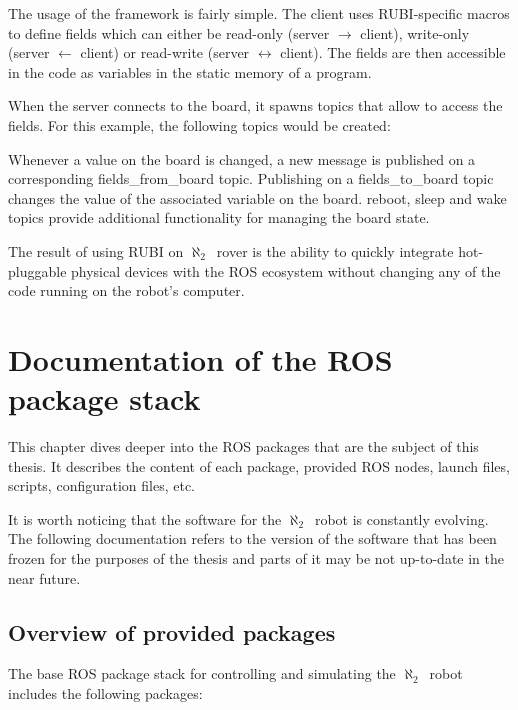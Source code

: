 \documentclass[english,inz,shortabstract]{iithesis}
\newcommand{\rovername}{$\aleph_2$\ }
\begin{document}
	The usage of the framework is fairly simple. The client uses RUBI-specific macros to define fields which can either be read-only (server $\rightarrow$ client), write-only (server $\leftarrow$ client) or read-write (server $\leftrightarrow$ client). The fields are then accessible in the code as variables in the static memory of a program.

	

	When the server connects to the board, it spawns topics that allow to access the fields. For this example, the following topics would be created:

	

	Whenever a value on the board is changed, a new message is published on a corresponding \textsf{fields\_from\_board} topic. Publishing on a \textsf{fields\_to\_board} topic changes the value of the associated variable on the board. \textsf{reboot}, \textsf{sleep} and \textsf{wake} topics provide additional functionality for managing the board state.

	The result of using RUBI on \rovername rover is the ability to quickly integrate hot-pluggable physical devices with the ROS ecosystem without changing any of the code running on the robot's computer.


\chapter{Documentation of the ROS package stack}

This chapter dives deeper into the ROS packages that are the subject of this thesis. It describes the content of each package, provided ROS nodes, launch files, scripts, configuration files, etc.

It is worth noticing that the software for the \rovername robot is constantly evolving. The following documentation refers to the version of the software that has been frozen for the purposes of the thesis and parts of it may be not up-to-date in the near future.

\section{Overview of provided packages} \label{overview}

	The base ROS package stack for controlling and simulating the \rovername robot includes the following packages:
\end{document}
